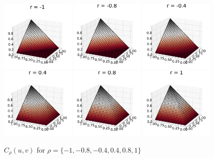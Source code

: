 \documentclass[runningheads]{llncs}
\begin{document}
\begin{figure}[!t]
    \centering
    \includegraphics[width=0.32\textwidth]{figures/copulas/cop_-1.pdf}
    \includegraphics[width=0.32\textwidth]{figures/copulas/cop_-0.8.pdf}
    \includegraphics[width=0.32\textwidth]{figures/copulas/cop_-0.4.pdf}
    \includegraphics[width=0.32\textwidth]{figures/copulas/cop_0.4.pdf}
    \includegraphics[width=0.32\textwidth]{figures/copulas/cop_0.8.pdf}
    \includegraphics[width=0.32\textwidth]{figures/copulas/cop_1.pdf}
    
    \caption{$C_\rho(u,v)$ for $\rho=\{-1, -0.8, -0.4, 0.4, 0.8, 1\}$}
    \label{fig:copulas}
\end{figure}
\end{document}
